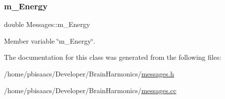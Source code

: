 \mbox{\label{classMessages_afd1431daeff8d60f5856b36144b49f87}} 
\subsubsection{\texorpdfstring{m\+\_\+\+Energy}{m\_Energy}}
{\footnotesize\ttfamily double Messages\+::m\+\_\+\+Energy\hspace{0.3cm}{\ttfamily [private]}}



Member variable \char`\"{}m\+\_\+\+Energy\char`\"{}. 



The documentation for this class was generated from the following files\+:\begin{DoxyCompactItemize}
\item 
/home/pbisaacs/\+Developer/\+Brain\+Harmonics/\mbox{\hyperlink{messages_8h}{messages.\+h}}\item 
/home/pbisaacs/\+Developer/\+Brain\+Harmonics/\mbox{\hyperlink{messages_8cc}{messages.\+cc}}\end{DoxyCompactItemize}
